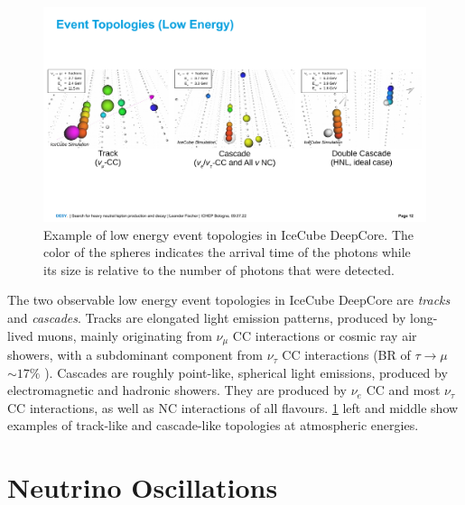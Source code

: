 \documentclass[a4paper,11pt]{article}
\begin{document}
\begin{figure}[h]
    \includegraphics[trim = 0cm 4.5cm 0cm 5.5cm, clip, width=1.0\linewidth]{figures/event_views_all_three.png}
    \caption{Example of low energy event topologies in IceCube DeepCore. The color of the spheres indicates the arrival time of the photons while its size is relative to the number of photons that were detected.}
    \label{fig:low_energy_eventviews}
  \end{figure}

The two observable low energy event topologies in IceCube DeepCore are \textit{tracks} and \textit{cascades}. Tracks are elongated light emission patterns, produced by long-lived muons, mainly originating from $\nu_{\mu}$ CC interactions or cosmic ray air showers, with a subdominant component from $\nu_{\tau}$ CC interactions (BR of $\tau\rightarrow\mu$ $\sim 17\%$ \cite{PhysRevD.98.030001}). Cascades are roughly point-like, spherical light emissions, produced by electromagnetic and hadronic showers. They are produced by $\nu_{e}$ CC and most $\nu_{\tau}$ CC interactions, as well as NC interactions of all flavours. \cref{fig:low_energy_eventviews} left and middle show examples of track-like and cascade-like topologies at atmospheric energies.


\section{Neutrino Oscillations} \label{sec:neutrino_oscillations}
\end{document}
